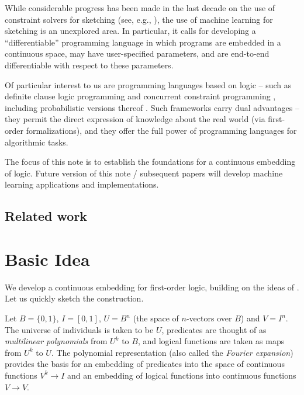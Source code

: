 \documentclass{article} %
\begin{document}
While considerable progress has been made in the last decade on the use of constraint solvers for sketching (see, e.g., \cite{armando}), the use of machine learning for sketching is an unexplored area. In particular, it calls for developing a ``differentiable'' programming language in which programs are embedded in a continuous space, may have user-specified parameters, and are end-to-end differentiable with respect to these parameters.  

Of particular interest to us are programming languages based on logic -- such as definite clause logic programming \cite{Kowalski76} and concurrent constraint programming \cite{CCP}, including probabilistic versions thereof \cite{muggleton:srl07,Gupta97b,cussens}. Such frameworks carry dual advantages -- they permit the direct expression of knowledge about the real world (via first-order formalizations), and they offer the full power of programming languages for algorithmic tasks. 

The focus of this note is to establish the foundations for a continuous embedding of logic. Future version of this note / subsequent papers will develop machine learning applications and implementations. 

\subsection{Related work}





\section{Basic Idea}
We develop a continuous embedding for first-order logic, building on the ideas of \cite{boolean-function}. Let us quickly sketch the construction.

Let $B=\{0,1\}$, $I=[0,1]$, $U=B^n$ (the space of $n$-vectors over $B$) and $V=I^n$. The universe of individuals is taken to be $U$, predicates are thought of as {\em multilinear polynomials} from $U^k$ to $B$, and logical functions are taken as maps from $U^k$ to $U$. The polynomial representation (also called the {\em Fourier expansion}) provides the basis for an embedding of  predicates into the space of continuous functions $V^k \rightarrow I$ and an embedding of logical functions into continuous functions $V\rightarrow V$.   
\end{document}
